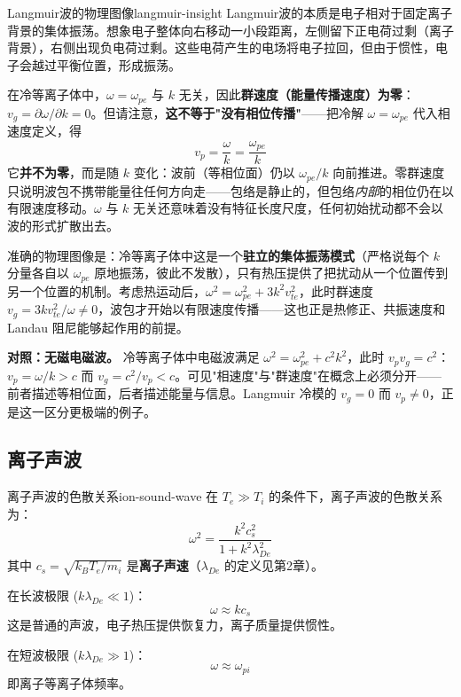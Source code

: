 \documentclass[12pt,a4paper,openany,oneside]{book}
\begin{document}
\begin{insight}{Langmuir波的物理图像}{langmuir-insight}
Langmuir波的本质是电子相对于固定离子背景的集体振荡。想象电子整体向右移动一小段距离，左侧留下正电荷过剩（离子背景），右侧出现负电荷过剩。这些电荷产生的电场将电子拉回，但由于惯性，电子会越过平衡位置，形成振荡。

在冷等离子体中，$\omega=\omega_{pe}$ 与 $k$ 无关，因此\textbf{群速度（能量传播速度）为零}：$v_g=\partial\omega/\partial k=0$。但请注意，\textbf{这不等于"没有相位传播"}——把冷解 $\omega=\omega_{pe}$ 代入相速度定义，得
\[
v_p = \frac{\omega}{k} = \frac{\omega_{pe}}{k}
\]
它\textbf{并不为零}，而是随 $k$ 变化：波前（等相位面）仍以 $\omega_{pe}/k$ 向前推进。零群速度只说明波包不携带能量往任何方向走——包络是静止的，但包络\emph{内部}的相位仍在以有限速度移动。$\omega$ 与 $k$ 无关还意味着没有特征长度尺度，任何初始扰动都不会以波的形式扩散出去。

准确的物理图像是：冷等离子体中这是一个\textbf{驻立的集体振荡模式}（严格说每个 $k$ 分量各自以 $\omega_{pe}$ 原地振荡，彼此不发散），只有热压提供了把扰动从一个位置传到另一个位置的机制。考虑热运动后，$\omega^2=\omega_{pe}^2+3k^2v_{te}^2$，此时群速度 $v_g=3kv_{te}^2/\omega\neq0$，波包才开始以有限速度传播——这也正是热修正、共振速度和 Landau 阻尼能够起作用的前提。

\smallskip
\textbf{对照：无磁电磁波。} 冷等离子体中电磁波满足 $\omega^2=\omega_{pe}^2+c^2k^2$，此时 $v_pv_g=c^2$：$v_p=\omega/k>c$ 而 $v_g=c^2/v_p<c$。可见"相速度"与"群速度"在概念上必须分开——前者描述等相位面，后者描述能量与信息。Langmuir 冷模的 $v_g=0$ 而 $v_p\neq0$，正是这一区分更极端的例子。
\end{insight}

\subsection{离子声波}

\begin{theorem}{离子声波的色散关系}{ion-sound-wave}
在 $T_e \gg T_i$ 的条件下，离子声波的色散关系为：
\[
\omega^2 = \frac{k^2 c_s^2}{1 + k^2\lambda_{De}^2}
\]
其中 $c_s = \sqrt{k_B T_e/m_i}$ 是\textbf{离子声速}（$\lambda_{De}$ 的定义见第2章）。

在长波极限 ($k\lambda_{De} \ll 1$)：
\[
\omega \approx k c_s
\]
这是普通的声波，电子热压提供恢复力，离子质量提供惯性。

在短波极限 ($k\lambda_{De} \gg 1$)：
\[
\omega \approx \omega_{pi}
\]
即离子等离子体频率。
\end{theorem}
\end{document}

